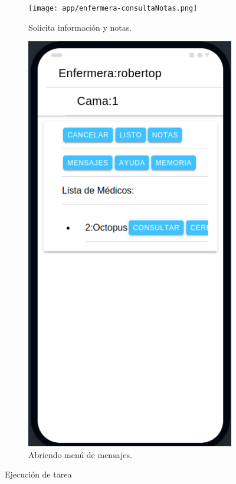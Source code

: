 \begin{figure}[!htpb]
\begin{subfigure}[b]{0.3\textwidth}
     \end{subfigure}
     \hfill
     \begin{subfigure}[b]{0.3\textwidth}
         \centering
         \texttt{[image: app/enfermera-consultaNotas.png]}
         \caption{Solicita información y notas.}
         \label{fig_3:2de3}
     \end{subfigure}
     \hfill
     \begin{subfigure}[b]{0.3\textwidth}
         \centering
         \includegraphics[width=.95\textwidth]{./Figures/app/enfermera-msg.png}
         \caption{Abriendo menú de mensajes.}
         \label{fig_3:3de3}
     \end{subfigure}
        \caption{Ejecución de tarea}
        \label{fig_3:Ejecución de tarea}
\end{figure}
